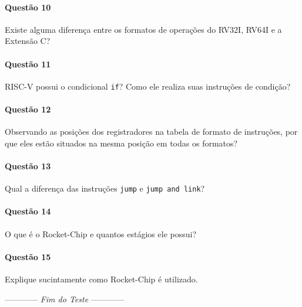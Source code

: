 \documentclass[a4paper,12pt,fleqn]{article}
\newcommand{\lastwords}{Fim do Teste}
\begin{document}
\paragraph{Questão 10} Existe alguma diferença entre os formatos de operações do RV32I, RV64I e a Extensão C?

\paragraph{Questão 11} RISC-V possui o condicional \texttt{if}? Como ele realiza suas instruções de condição?


\paragraph{Questão 12} Observando as posições dos registradores na tabela de formato de instruções, por que eles estão situados na mesma posição em todas os formatos?

\paragraph{Questão 13} Qual a diferença das instruções \texttt{jump} e \texttt{jump and link}?

\paragraph{Questão 14} O que é o Rocket-Chip e quantos estágios ele possui?

\paragraph{Questão 15} Explique sucintamente como Rocket-Chip é utilizado.

\begin{center}
\vspace{3cm}
------------ \textit{\lastwords} ------------
\end{center}


\label{finalpage}
\end{document}
